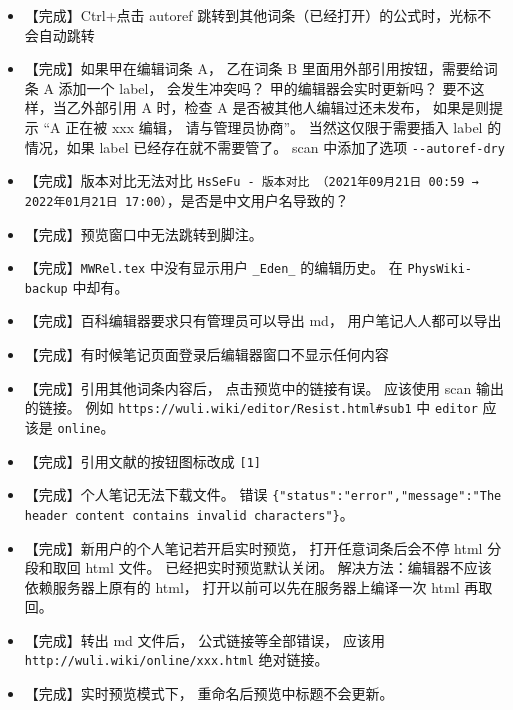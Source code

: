 \begin{itemize}
\item 【完成】Ctrl+点击 autoref 跳转到其他词条（已经打开）的公式时，光标不会自动跳转

\item 【完成】如果甲在编辑词条 A， 乙在词条 B 里面用外部引用按钮，需要给词条 A 添加一个 label， 会发生冲突吗？ 甲的编辑器会实时更新吗？ 要不这样，当乙外部引用 A 时，检查 A 是否被其他人编辑过还未发布， 如果是则提示 “A 正在被 xxx 编辑， 请与管理员协商”。 当然这仅限于需要插入 label 的情况，如果 label 已经存在就不需要管了。 scan 中添加了选项 \verb|--autoref-dry|

\item 【完成】版本对比无法对比 \verb|HsSeFu - 版本对比 （2021年09月21日 00:59 → 2022年01月21日 17:00）|，是否是中文用户名导致的？

\item 【完成】预览窗口中无法跳转到脚注。

\item 【完成】\verb|MWRel.tex| 中没有显示用户 \verb|_Eden_| 的编辑历史。 在 \verb|PhysWiki-backup| 中却有。

\item 【完成】百科编辑器要求只有管理员可以导出 md， 用户笔记人人都可以导出

\item 【完成】有时候笔记页面登录后编辑器窗口不显示任何内容

\item 【完成】引用其他词条内容后， 点击预览中的链接有误。 应该使用 scan 输出的链接。 例如 \verb|https://wuli.wiki/editor/Resist.html#sub1| 中 \verb|editor| 应该是 \verb|online|。

\item 【完成】引用文献的按钮图标改成 \verb|[1]|

\item 【完成】个人笔记无法下载文件。 错误 \verb|{"status":"error","message":"The header content contains invalid characters"}|。

\item 【完成】新用户的个人笔记若开启实时预览， 打开任意词条后会不停 html 分段和取回 html 文件。 已经把实时预览默认关闭。 解决方法：编辑器不应该依赖服务器上原有的 html， 打开以前可以先在服务器上编译一次 html 再取回。

\item 【完成】转出 md 文件后， 公式链接等全部错误， 应该用 \verb|http://wuli.wiki/online/xxx.html| 绝对链接。

\item 【完成】实时预览模式下， 重命名后预览中标题不会更新。


\end{itemize}
